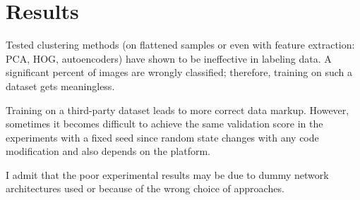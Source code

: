\documentclass{article}
\begin{document}
\section{Results}

Tested clustering methods (on flattened samples or even with feature
extraction: PCA, HOG, autoencoders) have shown to be ineffective in labeling
data. A significant percent of images are wrongly classified; therefore,
training on such a dataset gets meaningless.

Training on a third-party dataset leads to more correct data markup. However,
sometimes it becomes difficult to achieve the same validation score in the experiments
with a fixed seed since random state changes with any code modification and also
depends on the platform.

I admit that the poor experimental results may be due to dummy network architectures
used or because of the wrong choice of approaches.
\end{document}
